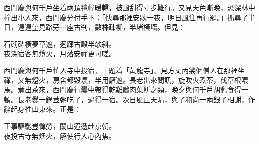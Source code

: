 西門慶與何千戶坐着兩頂氊幃暖轎，被風刮得寸步難行。又見天色漸晚，恐深林中撞出小人來，西門慶分付手下：「快尋那裡安歇一夜，明日風住再行罷。」抓尋了半日，遠遠望見路旁一座古剎，數株疎柳，半堵橫墻。但見：

\begin{myquote}
石砌碑橫夢草遮，迴廊古殿半欹斜。\\夜深宿客無燈火，月落安禪更可嗟。
\end{myquote}

西門慶與何千戶忙入寺中投宿，上題着「黃龍寺」。見方丈內幾個僧人在那裡坐禪，又無燈火，房舍都毀壞，半用籬遮。{}長老出來問訊，旋吹火煮茶，伐草根喂馬。煮出茶來，西門慶行囊中帶得乾雞臘肉菓餅之類，晚夕與何千戶胡亂食得一頓。長老爨一鍋荳粥吃了，過得一宿。次日風止天晴，與了和尚一兩銀子相謝，作辭起身徃山東來。正是：

\begin{myquote}
王事驅馳豈憚勞，關山迢遞赴京朝。\\夜投古寺無烟火，解使行人心內焦。
\end{myquote}

